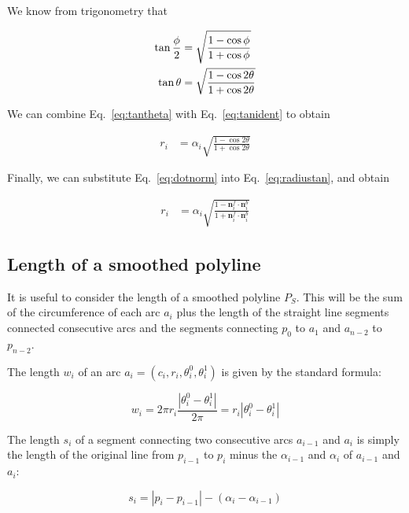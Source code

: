 \documentclass{article}
\begin{document}
We know from trigonometry that

\begin{align}
  \notag
  \tan \frac{\phi}{2} &= \sqrt{\frac{1-\cos\phi}{1+\cos\phi}}\\
  \label{eq:tanident}
  \tan \theta &= \sqrt{\frac{1-\cos 2\theta}{1+\cos 2\theta}}
\end{align}

We can combine Eq.~\eqref{eq:tantheta} with Eq.~\eqref{eq:tanident} to obtain

\begin{align}
  \label{eq:radiustan}
  r_{i} &= \alpha_i\sqrt{\frac{1-\cos 2\theta}{1+\cos 2\theta}}
\end{align}

Finally, we can substitute Eq.~\eqref{eq:dotnorm} into Eq.~\eqref{eq:radiustan}, and obtain

\begin{align}
  \label{eq:radius-alpha}
  r_{i} &= \alpha_i\sqrt{\frac{1-\mathbf{n}^f_i\cdot \mathbf{n}^b_i}{1+\mathbf{n}^f_i\cdot \mathbf{n}^b_i}}
\end{align}

\subsection{Length of a smoothed polyline}

It is useful to consider the length of a smoothed polyline $P_S$.  This will be the sum of the circumference of each arc $a_i$ plus the length of the straight line segments connected consecutive arcs and the segments connecting $p_0$ to $a_1$ and $a_{n-2}$ to $p_{n-2}$.

The length $w_i$ of an arc $a_i = \left(c_i, r_i, \theta^0_i, \theta^1_i\right)$ is given by the standard formula:

\begin{equation}
  \label{eq:circumference}
  w_i  = 2\pi r_i \frac{\left|\theta^0_i - \theta^1_i\right|}{2\pi} = r_i \left|\theta^0_i - \theta^1_i\right|
\end{equation}

The length $s_i$ of a segment connecting two consecutive arcs $a_{i-1}$ and $a_i$ is simply the length of the original line from $p_{i-1}$ to $p_i$ minus the $\alpha_{i-1}$ and $\alpha_i$ of $a_{i-1}$ and $a_i$:

\begin{equation}
  \label{eq:seglen}
  s_i = \left|p_i - p_{i-1}\right| - (\alpha_i - \alpha_{i-1})
\end{equation}
\end{document}
